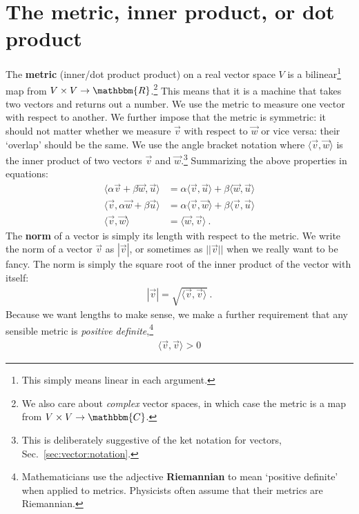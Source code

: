 \documentclass[
  11pt,
	colorful,
	raggedright,
]{tufte-style-thesis-flip}
\begin{document}
\section{The metric, inner product, or dot product}

The \textbf{metric} (inner/dot product product) on a real vector space $V$ is a bilinear\footnote{This simply means linear in each argument.} map from $V\times V\to \mathbbm{R}$.\footnote{We also care about \emph{complex} vector spaces, in which case the metric is a map from $V\times V\to \mathbbm{C}$.} This means that it is a machine that takes two vectors and returns out a number. We use the metric to measure one vector with respect to another. We further impose that the metric is symmetric: it should not matter whether we measure $\vec{v}$ with respect to $\vec{w}$ or vice versa: their `overlap' should be the same. 
%
We use the angle bracket notation where $\langle \vec{v},\vec{w}\rangle$ is the inner product of two vectors $\vec{v}$ and $\vec{w}$.\footnote{This is deliberately suggestive of the ket notation for vectors, Sec.~\ref{sec:vector:notation}.}
%
Summarizing the above properties in equations:
\begin{align}
  \langle \alpha \vec{v}+\beta\vec{w}, \vec{u} \rangle &=
  \alpha \langle \vec{v},\vec{u}\rangle +
  \beta \langle \vec{w},\vec{u}\rangle 
  \\
  \langle \vec{v}, \alpha \vec{w} + \beta \vec{u} \rangle &=
  \alpha \langle \vec{v},\vec{w}\rangle +
  \beta \langle \vec{v},\vec{u}\rangle 
  \\
  \langle \vec{v},\vec{w}\rangle  &=
  \langle \vec{w},\vec{v}\rangle  \ .
\end{align}
The \textbf{norm} of a vector is simply its length with respect to the metric. We write the norm of a vector $\vec{v}$ as $|\vec{v}|$, or sometimes as $||\vec{v}||$ when we really want to be fancy. The norm is simply the square root of the inner product of the vector with itself:
\begin{align}
  |\vec{v}| = \sqrt{\langle \vec{v}, \vec{v}\rangle} \ .
\end{align}
Because we want lengths to make sense, we make a further requirement that any sensible metric is \emph{positive definite},\footnote{Mathematicians use the adjective \textbf{Riemannian} to mean `positive definite' when applied to metrics. Physicists often assume that their metrics are Riemannian.}
\begin{align}
  \langle \vec{v},\vec{v}\rangle > 0 
\end{align}
\end{document}
